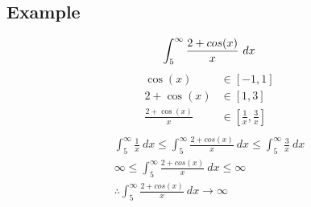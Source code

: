 \documentclass{article}
\theoremstyle{mytheoremstyle}
\theoremstyle{mytheoremstyle}
\theoremstyle{myproblemstyle}
\begin{document}
    \subsection*{Example}
    \[
        \int_{5}^{\infty} \frac{2+cos(x)}{x} \ dx \\
    \]
    \begin{align*}
        \cos(x) &\in [-1,1] \\
        2+\cos(x) &\in [1,3] \\
        \frac{2+\cos(x)}{x} &\in [\frac{1}{x}, \frac{3}{x}] \\
    \end{align*}
    \begin{gather*}
        \int_{5}^{\infty} \frac{1}{x} \ dx
        \le \int_{5}^{\infty} \frac{2+cos(x)}{x} \ dx
        \le \int_{5}^{\infty} \frac{3}{x} \ dx \\
        \infty \le \int_{5}^{\infty} \frac{2+cos(x)}{x} \ dx \le \infty \\
        \therefore \int_{5}^{\infty} \frac{2+cos(x)}{x} \ dx \rightarrow \infty
    \end{gather*}
\end{document}
